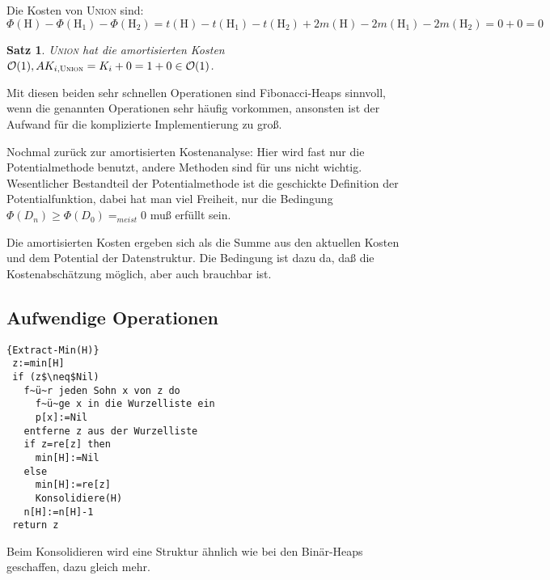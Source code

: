 \documentclass[ngerman,draft,parskip=half*,twoside]{scrreprt}
\theoremstyle{break}
\newtheorem{satz}{Satz}[chapter]
\theoremstyle{nonumberbreak}
\newcommand*{\OO}{\mathcal{O}}      %
\begin{document}
Die Kosten von \textsc{Union} sind:
\[\Phi(\mbox{H})-\Phi(\mbox{H}_1)-\Phi(\mbox{H}_2)=t(\mbox{H})-t(\mbox{H}_1)-t(\mbox{H}_2)+2m(\mbox{H})-2m(\mbox{H}_1)-
2m(\mbox{H}_2)=0+0=0\]

\begin{satz}
\textsc{Union} hat die amortisierten Kosten $\OO(1), AK_{i,
  \text{\textsc{Union}}} =K_i +0=1+0\in\OO(1)$.
\end{satz}

Mit diesen beiden sehr schnellen Operationen sind Fibonacci-Heaps sinnvoll, wenn die genannten Operationen sehr häufig
vorkommen, ansonsten ist der Aufwand für die komplizierte Implementierung zu groß.

Nochmal zurück zur amortisierten Kostenanalyse:
Hier wird fast nur die Potentialmethode benutzt, andere Methoden sind für uns nicht wichtig. Wesentlicher Bestandteil
der Potentialmethode ist die geschickte Definition der Potentialfunktion, dabei hat man viel Freiheit, nur die Bedingung $\Phi
(D_n) \geq \Phi(D_0)=_{meist}0$ muß erfüllt sein.

Die amortisierten Kosten ergeben sich als die Summe aus den aktuellen Kosten und dem Potential der Datenstruktur. Die
Bedingung ist dazu da, daß die Kostenabschätzung möglich, aber auch brauchbar ist.

\subsection{Aufwendige Operationen}
\begin{Algorithmus}[H]
\begin{lstlisting}[frame=tlrb, mathescape=true, title=\textsc{Extract-Min\textnormal{(H)}}, gobble=1]{Extract-Min(H)}
 z:=min[H]
 if (z$\neq$Nil)
   f~ü~r jeden Sohn x von z do
     f~ü~ge x in die Wurzelliste ein
     p[x]:=Nil
   entferne z aus der Wurzelliste
   if z=re[z] then
     min[H]:=Nil
   else
     min[H]:=re[z]
     Konsolidiere(H)
   n[H]:=n[H]-1
 return z   
\end{lstlisting}
Beim Konsolidieren wird eine Struktur ähnlich wie bei den Binär-Heaps geschaffen, dazu gleich mehr.
\end{Algorithmus}
\end{document}
